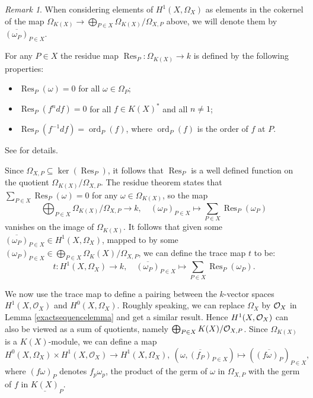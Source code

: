 \documentclass[draft, 11pt]{article} %
\theoremstyle{plain}
\theoremstyle{remark}
\newtheorem*{rem}{Remark}
\newcommand{\cO}{{\cal O}}
\newcommand{\ra}{\rightarrow}
\newcommand{\hzero}{{H^0(X,\Omega_X)}}
\newcommand{\hone}{H^1(X,\mathcal{O}_X)}
\DeclareMathOperator{\res}{Res}
\DeclareMathOperator{\ord}{ord}
\begin{document}
\begin{rem}
When considering elements of $H^1(X,\Omega_X)$ as elements in the cokernel of the map $\Omega_{K(X)} \ra \bigoplus_{P \in X}\Omega_{K(X)}/\Omega_{X,P}$ above, we will denote them by $\overline{(\omega_P)}_{P \in X}$.
\end{rem}

For any $P\in X$ the residue map $\res_P \colon \Omega_{K(X)} \ra k$ is defined by the following properties:
\begin{itemize}
\item $\res_P(\omega) = 0$ for all $\omega \in \Omega_{P}$;
\item $\res_P(f^ndf) = 0$ for all $f \in K(X)^*$ and all $n \neq 1$;
\item $\res_P(f^{-1}df) = \ord_P(f)$, where $\ord_P(f)$ is the order of $f$ at $P$.
\end{itemize}
See \cite[Chap III, Thm. 7.14.1]{hart} for details.



Since $\Omega_{X,P} \subseteq \ker (\res_P)$, it follows that $\res_P$ is a well defined function on the quotient $\Omega_{K(X)}/\Omega_{X,P}$.
The residue theorem \cite[Chap. III, Thm. 7.14.2]{hart} states that $\sum_{P\in X} \res_P(\omega) = 0$ for any $\omega \in \Omega_{K(X)}$, so the map 
\[
\bigoplus_{P \in X} \Omega_{K(X)}/\Omega_{X,P} \ra k, \quad (\omega_P)_{P \in X} \mapsto \sum_{P\in X} \res_P(\omega_P)
\]
vanishes on the image of $\Omega_{K(X)}$.
It follows that given some $\overline{(\omega_P)}_{P \in X} \in H^1(X,\Omega_X)$, mapped to by some $(\omega_P)_{P \in X} \in \bigoplus_{P \in X} \Omega_K(X)/\Omega_{X,P}$, we can define the trace map $t$ to be:
\[
t \colon H^1\left(X, \Omega_X\right) \ra k,\quad \overline{(\omega_P)}_{P \in X}  \mapsto \sum_{P \in X} \res_P(\omega_P).
\]


We now use the trace map to define a pairing between the $k$-vector spaces $\hone$ and $\hzero$.
Roughly speaking, we can replace $\Omega_X$ by $\cO_X$ in Lemma \ref{exactsequencelemma} and get a similar result.
Hence $H^1(X,\cO_X)$ can also be viewed as a sum of quotients, namely $\bigoplus_{P \in X} K(X)/\cO_{X,P}$.
Since $\Omega_{K(X)}$ is a $K(X)$-module, we can define a map 
\begin{equation}\label{productmap}
\hzero \times \hone \ra H^1\left(X, \Omega_X\right), \ (\omega, \overline{(f_P)}_{P \in X}) \mapsto ( \overline {(f  \omega)_P})_{P \in X},
\end{equation}
where $(f\omega)_P$ denotes $f_p\omega_p$, the product of the germ of $\omega$ in $\Omega_{X,P}$ with the germ of $f$ in $\underline{K(X)}_{P}$.
\end{document}
